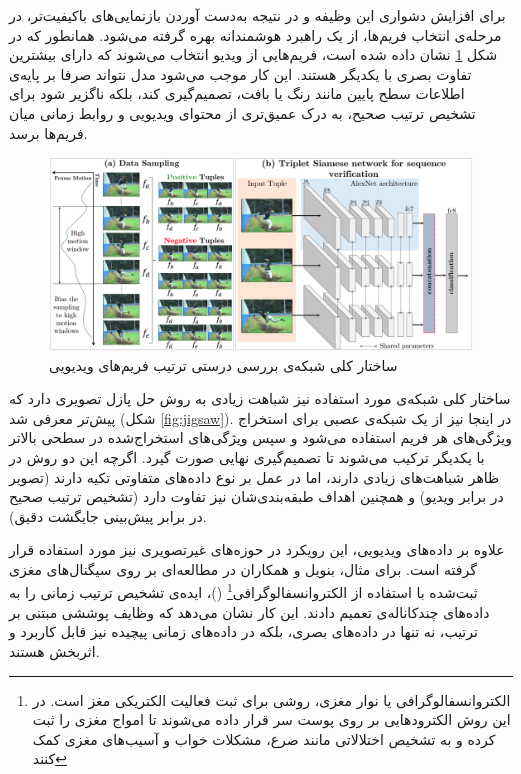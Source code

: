 برای افزایش دشواری این وظیفه و در نتیجه به‌دست آوردن بازنمایی‌های باکیفیت‌تر، در مرحله‌ی انتخاب فریم‌ها، از یک راهبرد هوشمندانه بهره گرفته می‌شود. همانطور که در شکل \ref{fig:video-permutation} نشان داده شده است، فریم‌هایی از ویدیو انتخاب می‌شوند که دارای بیشترین تفاوت‌ بصری با یکدیگر هستند. این کار موجب می‌شود مدل نتواند صرفا بر پایه‌ی اطلاعات سطح پایین مانند رنگ یا بافت، تصمیم‌گیری کند، بلکه ناگزیر شود برای تشخیص ترتیب صحیح، به درک عمیق‌تری از محتوای ویدیویی و روابط زمانی میان فریم‌ها برسد.

\begin{figure}[htbp]
\centering
\includegraphics[width=1\textwidth]{Images/Chapter2/video-permutation.png}
\caption{ساختار کلی شبکه‌ی بررسی درستی ترتیب فریم‌های ویدیویی}
\label{fig:video-permutation}
\end{figure}

ساختار کلی شبکه‌ی مورد استفاده نیز شباهت زیادی به روش حل پازل تصویری دارد که پیش‌تر معرفی شد (شکل \ref{fig:jigsaw}). در اینجا نیز از یک شبکه‌ی عصبی برای استخراج ویژگی‌های هر فریم استفاده می‌شود و سپس ویژگی‌های استخراج‌شده در سطحی بالاتر با یکدیگر ترکیب می‌شوند تا تصمیم‌گیری نهایی صورت گیرد. اگرچه این دو روش در ظاهر شباهت‌های زیادی دارند، اما در عمل بر نوع داده‌های متفاوتی تکیه دارند (تصویر در برابر ویدیو) و همچنین اهداف طبقه‌بندی‌شان نیز تفاوت دارد (تشخیص ترتیب صحیح در برابر پیش‌بینی جایگشت دقیق).

علاوه بر داده‌های ویدیویی، این رویکرد در حوزه‌های غیرتصویری نیز مورد استفاده قرار گرفته است. برای مثال، بنویل و همکاران \cite{banville2019self} در مطالعه‌ای بر روی سیگنال‌های مغزی ثبت‌شده با استفاده از الکتروانسفالوگرافی\footnote{الکتروانسفالوگرافی یا نوار مغزی، روشی برای ثبت فعالیت الکتریکی مغز است. در این روش الکترودهایی بر روی پوست سر قرار داده می‌شوند تا امواج مغزی را ثبت کرده و به تشخیص اختلالاتی مانند صرع، مشکلات خواب و آسیب‌های مغزی کمک کنند} ()،
ایده‌ی تشخیص ترتیب زمانی را به داده‌های چندکاناله‌ی  تعمیم دادند. این کار نشان می‌دهد که وظایف پوششی مبتنی بر ترتیب، نه تنها در داده‌های بصری، بلکه در داده‌های زمانی پیچیده نیز قابل کاربرد و اثربخش هستند.

